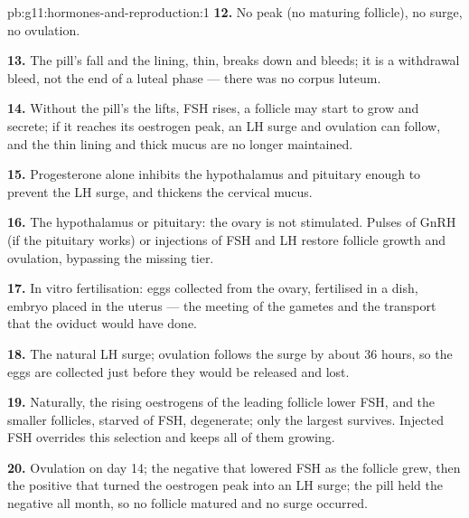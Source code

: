 \begin{solution}{pb:g11:hormones-and-reproduction:1}
\textbf{12.} No peak (no maturing follicle), no surge, no ovulation.

\textbf{13.} The pill's  fall and the lining, thin, breaks
down and bleeds; it is a withdrawal bleed, not the end of a luteal
phase --- there was no corpus luteum.

\textbf{14.} Without the pill's  the  lifts, FSH rises,
a follicle may start to grow and secrete; if it reaches its oestrogen
peak, an LH surge and ovulation can follow, and the thin lining and
thick mucus are no longer maintained.

\textbf{15.} Progesterone alone inhibits the hypothalamus and pituitary
enough to prevent the LH surge, and thickens the cervical mucus.

\textbf{16.} The hypothalamus or pituitary: the ovary is not
stimulated. Pulses of GnRH (if the pituitary works) or injections of
FSH and LH restore follicle growth and ovulation, bypassing the
missing tier.

\textbf{17.} In vitro fertilisation: eggs collected from the ovary,
fertilised in a dish, embryo placed in the uterus --- the meeting of
the gametes and the transport that the oviduct would have done.

\textbf{18.} The natural LH surge; ovulation follows the surge by
about 36 hours, so the eggs are collected just before they would be
released and lost.

\textbf{19.} Naturally, the rising oestrogens of the leading follicle
lower FSH, and the smaller follicles, starved of FSH, degenerate;
only the largest survives. Injected FSH overrides this selection and
keeps all of them growing.

\textbf{20.} Ovulation on day 14; the negative  that lowered
FSH as the follicle grew, then the positive  that turned the
oestrogen peak into an LH surge; the pill held the  negative
all month, so no follicle matured and no surge occurred.
\end{solution}
